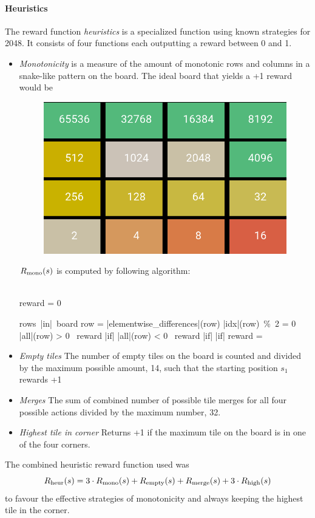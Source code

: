 \documentclass[11pt, fleqn]{article}
\begin{document}
\paragraph*{Heuristics}
The reward function \textit{heuristics} is a specialized function using known strategies for 2048. It consists of four functions each outputting a reward between 0 and 1.
\begin{itemize}
	\item \textit{Monotonicity} is a measure of the amount of  monotonic rows and columns in a snake-like pattern on the board. The ideal board that yields a +1 reward would be
\begin{figure}[H]
	\centering
	\includegraphics[width=0.5\linewidth]{perfect_monotonic}
\end{figure}
$R_\textup{mono}(s)$ is computed by following algorithm:
\begin{program}
\BEGIN \\ %
reward = 0

\FOR rows\ |in|\ board \DO {}
\Delta row = |elementwise\_differences|(row) 
\IF |idx|(row)\ \%\ 2 = 0\ 
\IF |all|(\Delta row) > 0\ \DO 
reward 	\mathrel{{+}{+}} \OD\END|if| 
\ELSE {}
 	\IF |all|(\Delta row) < 0\ \DO 
reward 	\mathrel{{+}{+}} \OD\END|if| 
\OD\END|if|
reward =  
\END 
\end{program}
\item \textit{Empty tiles} The number of empty tiles on the board is counted and divided by the maximum possible amount, 14, such that the starting position $s_1$ rewards +1
\item \textit{Merges} The sum of combined number of possible tile merges for all four possible actions divided by the maximum number, 32.
\item \textit{Highest tile in corner} Returns +1 if the maximum tile on the board is in one of the four corners.
\end{itemize}
The combined heuristic reward function used was
\begin{equation}\label{key}
R_\textup{heur}(s) = 3 \cdot R_\textup{mono}(s) + R_\textup{empty}(s) + R_\textup{merge}(s) + 3 \cdot  R_\textup{high}(s)
\end{equation}
to favour the effective strategies of monotonicity and always keeping the highest tile in the corner.
\end{document}
